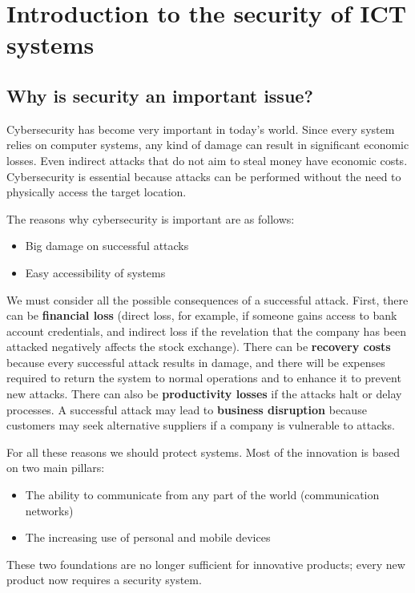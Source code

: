 \chapter{Introduction to the security of
  ICT systems}

\section{Why is security an important issue?}
Cybersecurity has become very important in today's world. Since every system relies on computer systems, any kind of damage can result in significant economic losses. Even indirect attacks that do not aim to steal money have economic costs. Cybersecurity is essential because attacks can be performed without the need to physically access the target location.


The reasons why cybersecurity is important are as follows:
\begin{itemize}
	\item Big damage on successful attacks
	\item Easy accessibility of systems
\end{itemize}

We must consider all the possible consequences of a successful attack. First, there can be \textbf{financial loss} (direct loss, for example, if someone gains access to bank account credentials, and indirect loss if the revelation that the company has been attacked negatively affects the stock exchange). There can be \textbf{recovery costs} because every successful attack results in damage, and there will be expenses required to return the system to normal operations and to enhance it to prevent new attacks. There can also be \textbf{productivity losses} if the attacks halt or delay processes. A successful attack may lead to \textbf{business disruption} because customers may seek alternative suppliers if a company is vulnerable to attacks.


For all these reasons we should protect systems. Most of the innovation is based on two main pillars:
\begin{itemize}
	\item The ability to communicate from any part of the world (communication networks)
	\item The increasing use of personal and mobile devices
\end{itemize}
These two foundations are no longer sufficient for innovative products; every new product now requires a security system.



